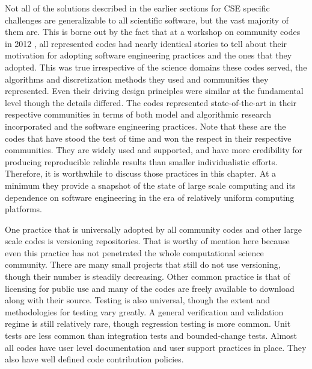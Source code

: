 \label{sec:generalization}

Not all of the solutions described in the earlier sections for CSE
specific challenges are generalizable to all scientific software, but
the vast majority of them are. This is borne out by the fact that at a
workshop on community codes in 2012 \cite{cc2012}, all represented codes
had nearly identical stories to tell about their motivation for
adopting software engineering practices and the ones that they
adopted. This was true irrespective of the science domains these codes
served, the algorithms and discretization methods they used and
communities they represented. Even their driving design principles
were similar at the fundamental level though the details differed. The
codes represented state-of-the-art in their respective communities in
terms of both model and algorithmic research incorporated and the
software engineering practices. Note that these are the codes that
have stood the test of time and won the respect in their respective
communities. They are widely used and supported, and have more
credibility for producing reproducible reliable results than smaller
individualistic efforts. Therefore, it is worthwhile to discuss
those practices in this chapter. At a minimum they provide a snapshot
of the state of large scale computing and its dependence on software
engineering in the era of relatively uniform computing platforms. 

One practice that is universally adopted by all community codes and
other large scale codes is versioning repositories. That is worthy of
mention here because even this practice has not penetrated the whole
computational science community. There are many small projects
that still do not use versioning, though their number is steadily
decreasing. Other common practice is that of licensing for public use
and many of the codes are freely available to download along with their
source. Testing is also universal, though the extent and methodologies
for testing vary greatly. A general verification and validation regime
is still relatively rare, though regression testing is more
common. Unit tests are less common than integration tests and
bounded-change tests. Almost all codes have user level documentation
and user support practices in place. They also have well defined code
contribution policies. 

